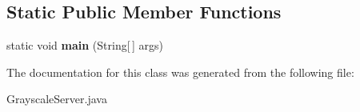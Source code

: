 \subsection*{Static Public Member Functions}
\begin{DoxyCompactItemize}
\item 
static void {\bfseries main} (String\mbox{[}$\,$\mbox{]} args)\hypertarget{classGrayscaleServer_ab292e713596db3cea2c2abb570441edf}{}\label{classGrayscaleServer_ab292e713596db3cea2c2abb570441edf}

\end{DoxyCompactItemize}


The documentation for this class was generated from the following file\+:\begin{DoxyCompactItemize}
\item 
Grayscale\+Server.\+java\end{DoxyCompactItemize}
